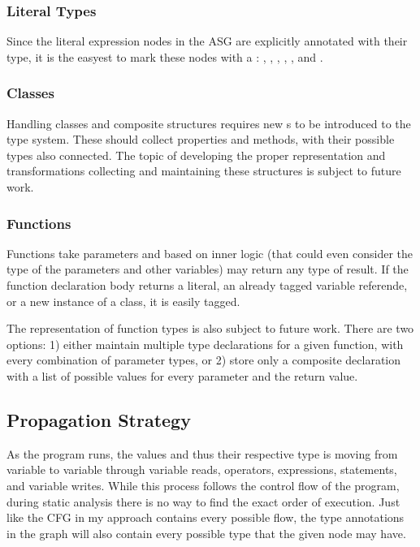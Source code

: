 \subsubsection{Literal Types}
Since the literal expression nodes in the ASG are explicitly annotated with their type, it is the easyest to mark these nodes with a : , , , , , and .

\subsubsection{Classes}
Handling classes and composite structures requires new s to be introduced to the type system. These should collect properties and methods, with their possible types also connected. The topic of developing the proper representation and transformations collecting and maintaining these structures is subject to future work.

\subsubsection{Functions}
Functions take parameters and based on inner logic (that could even consider the type of the parameters and other variables) may return any type of result. If the function declaration body returns a literal, an already tagged variable referende, or a new instance of a class, it is easily tagged.

The representation of function types is also subject to future work. There are two options: 1) either maintain multiple type declarations for a given function, with every combination of parameter types, or 2) store only a composite declaration with a list of possible values for every parameter and the return value.

\subsection{Propagation Strategy}
As the program runs, the values and thus their respective type is moving from variable to variable through variable reads, operators, expressions, statements, and variable writes. While this process follows the control flow of the program, during static analysis there is no way to find the exact order of execution. Just like the CFG in my approach contains every possible flow, the type annotations in the graph will also contain every possible type that the given node may have.

